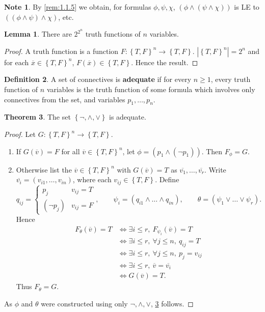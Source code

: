 \documentclass{article}
\newcommand{\rb}[1]{\left( #1 \right)}
\newcommand{\cb}[1]{\left\{ #1 \right\}}
\newcommand{\abs}[1]{\left\lvert #1 \right\rvert}
\newcommand{\notb}[1]{\rb{\neg #1}}
\newcommand{\andb}[2]{\rb{#1 \land #2}}
\theoremstyle{definition}\newtheorem{definition}{Definition}[subsection]
\theoremstyle{definition}\newtheorem{remark}[definition]{Remark}
\theoremstyle{definition}\newtheorem*{example}{Example}
\theoremstyle{definition}\newtheorem*{note}{Note}
\newtheorem{lemma}[definition]{Lemma}
\newtheorem{theorem}[definition]{Theorem}
\begin{document}
\begin{note}
By \ref{rem:1.1.5} we obtain, for formulas $ \phi, \psi, \chi $, $ \andb{\phi}{\andb{\psi}{\chi}} $ is LE to $ \andb{\andb{\phi}{\psi}}{\chi} $, etc.
\end{note}

\begin{lemma}
There are $ 2^{2^n} $ truth functions of $ n $ variables.
\end{lemma}

\begin{proof}
A truth function is a function $ F : \cb{T, F}^n \to \cb{T, F} $. $ \abs{\cb{T, F}^n} = 2^n $ and for each $ \overline{x} \in \cb{T, F}^n $, $ F\rb{\overline{x}} \in \cb{T, F} $. Hence the result.
\end{proof}

\begin{definition}
A set of connectives is \textbf{adequate} if for every $ n \ge 1 $, every truth function of $ n $ variables is the truth function of some formula which involves only connectives from the set, and variables $ p_1, \dots, p_n $.
\end{definition}

\begin{theorem}
\label{thm:1.1.9}
The set $ \cb{\neg, \land, \lor} $ is adequate.
\end{theorem}

\begin{proof}
Let $ G : \cb{T, F}^n \to \cb{T, F} $.
\begin{enumerate}
\item If $ G\rb{\overline{v}} = F $ for all $ \overline{v} \in \cb{T, F}^n $, let $ \phi = \andb{p_1}{\notb{p_1}} $. Then $ F_\phi = G $.
\item Otherwise list the $ \overline{v} \in \cb{T, F}^n $ with $ G\rb{\overline{v}} = T $ as $ \overline{v_1}, \dots, \overline{v_r} $. Write $ \overline{v_i} = \rb{v_{i1}, \dots, v_{in}} $, where each $ v_{ij} \in \cb{T, F} $. Define
$$ q_{ij} = \begin{cases} p_j & v_{ij} = T \\ \notb{p_j} & v_{ij} = F \end{cases}, \qquad \psi_i = \rb{q_{i1} \land \dots \land q_{in}}, \qquad \theta = \rb{\psi_1 \lor \dots \lor \psi_r}. $$
Hence
\begin{align*}
F_\theta\rb{\overline{v}} = T
& \iff \exists i \le r, \ F_{\psi_i}\rb{\overline{v}} = T \\
& \iff \exists i \le r, \ \forall j \le n, \ q_{ij} = T \\
& \iff \exists i \le r, \ \forall j \le n, \ p_j = v_{ij} \\
& \iff \exists i \le r, \ \overline{v} = \overline{v_i} \\
& \iff G\rb{\overline{v}} = T.
\end{align*}
Thus $ F_\theta = G $.
\end{enumerate}
As $ \phi $ and $ \theta $ were constructed using only $ \neg, \land, \lor $, \ref{thm:1.1.9} follows.
\end{proof}
\end{document}
